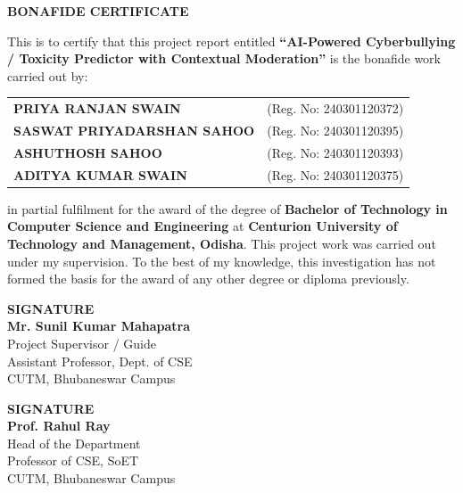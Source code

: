 \documentclass[12pt,a4paper]{article}
\begin{document}
\newpage
\thispagestyle{plain}
\begin{center}
    {\Large \textbf{BONAFIDE CERTIFICATE}\par}
    \vspace{0.8cm}
\end{center}

\noindent This is to certify that this project report entitled \textbf{``AI-Powered Cyberbullying / Toxicity Predictor with Contextual Moderation''} is the bonafide work carried out by:
\begin{center}
    \begin{tabular}{ll}
        \textbf{PRIYA RANJAN SWAIN} & (Reg. No: 240301120372) \\
        \textbf{SASWAT PRIYADARSHAN SAHOO} & (Reg. No: 240301120395) \\
        \textbf{ASHUTHOSH SAHOO} & (Reg. No: 240301120393) \\
        \textbf{ADITYA KUMAR SWAIN} & (Reg. No: 240301120375)
    \end{tabular}
\end{center}
in partial fulfilment for the award of the degree of \textbf{Bachelor of Technology in Computer Science and Engineering} at \textbf{Centurion University of Technology and Management, Odisha}. This project work was carried out under my supervision. To the best of my knowledge, this investigation has not formed the basis for the award of any other degree or diploma previously.

\vspace{2.5cm}

\noindent
\begin{minipage}[t]{0.48\textwidth}
    \textbf{SIGNATURE}\\[0.2cm]
    \textbf{Mr. Sunil Kumar Mahapatra}\\
    Project Supervisor / Guide\\
    Assistant Professor, Dept. of CSE\\
    CUTM, Bhubaneswar Campus
\end{minipage}
\hfill
\begin{minipage}[t]{0.48\textwidth}
    \textbf{SIGNATURE}\\[0.2cm]
    \textbf{Prof. Rahul Ray}\\
    Head of the Department\\
    Professor of CSE, SoET\\
    CUTM, Bhubaneswar Campus
\end{minipage}
\end{document}
